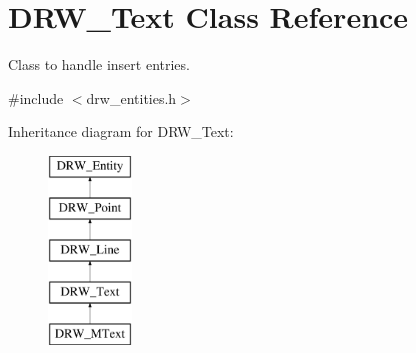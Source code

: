 \hypertarget{classDRW__Text}{\section{D\-R\-W\-\_\-\-Text Class Reference}
\label{classDRW__Text}
}


Class to handle insert entries.  




{\ttfamily \#include $<$drw\-\_\-entities.\-h$>$}

Inheritance diagram for D\-R\-W\-\_\-\-Text\-:\begin{figure}[H]
\begin{center}
\leavevmode
\includegraphics[height=5.000000cm]{classDRW__Text}
\end{center}
\end{figure}
